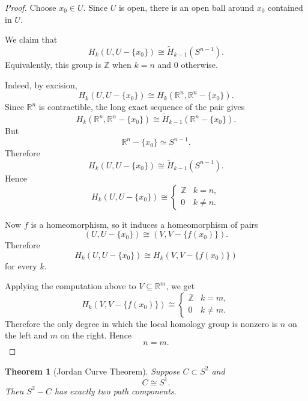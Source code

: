 \documentclass[11pt,a4paper]{article}
\theoremstyle{definition}
\theoremstyle{plain}
\newtheorem{theorem}[definition]{Theorem}
\theoremstyle{remark}
\newcommand{\1}{\mathbbm{1}}
\begin{document}
\begin{proof}
    Choose $x_0 \in U$. Since $U$ is open, there is an open ball around $x_0$ contained in $U$.

    We claim that
    \[
        H_k(U,U-\{x_0\})
        \cong
        \widetilde H_{k-1}(S^{n-1}).
    \]
    Equivalently, this group is $\mathbb Z$ when $k=n$ and $0$ otherwise.

    Indeed, by excision,
    \[
        H_k(U,U-\{x_0\})
        \cong
        H_k(\mathbb R^n,\mathbb R^n-\{x_0\}).
    \]
    Since $\mathbb R^n$ is contractible, the long exact sequence of the pair gives
    \[
        H_k(\mathbb R^n,\mathbb R^n-\{x_0\})
        \cong
        \widetilde H_{k-1}(\mathbb R^n-\{x_0\}).
    \]
    But
    \[
        \mathbb R^n-\{x_0\} \simeq S^{n-1}.
    \]
    Therefore
    \[
        H_k(U,U-\{x_0\})
        \cong
        \widetilde H_{k-1}(S^{n-1}).
    \]
    Hence
    \[
        H_k(U,U-\{x_0\})
        \cong
        \begin{cases}
            \mathbb Z & k=n,\\
            0 & k\neq n.
        \end{cases}
    \]

    Now $f$ is a homeomorphism, so it induces a homeomorphism of pairs
    \[
        (U,U-\{x_0\})
        \cong
        (V,V-\{f(x_0)\}).
    \]
    Therefore
    \[
        H_k(U,U-\{x_0\})
        \cong
        H_k(V,V-\{f(x_0)\})
    \]
    for every $k$.

    Applying the computation above to $V \subseteq \mathbb R^m$, we get
    \[
        H_k(V,V-\{f(x_0)\})
        \cong
        \begin{cases}
            \mathbb Z & k=m,\\
            0 & k\neq m.
        \end{cases}
    \]
    Therefore the only degree in which the local homology group is nonzero is $n$ on the left and $m$ on the right. Hence
    \[
        n=m.
    \]
\end{proof}

\begin{theorem}[Jordan Curve Theorem]
    Suppose $C \subset S^2$ and
    \[
        C \cong S^1.
    \]
    Then $S^2-C$ has exactly two path components.
\end{theorem}
\end{document}
